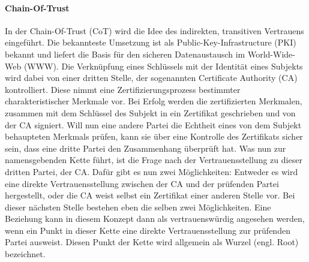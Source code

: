 \paragraph{Chain-Of-Trust}
In der Chain-Of-Trust (CoT) wird die Idee des indirekten, transitiven Vertrauens eingeführt. Die bekannteste Umsetzung ist als Public-Key-Infrastructure (PKI) bekannt und liefert die Basis für den sicheren Datenaustausch im World-Wide-Web (WWW). Die Verknüpfung eines Schlüssels mit der Identität eines Subjekts wird dabei von einer dritten Stelle, der sogenannten Certificate Authority (CA) kontrolliert. Diese nimmt eine Zertifizierungsprozess bestimmter charakteristischer Merkmale vor. Bei Erfolg werden die zertifizierten Merkmalen, zusammen mit dem Schlüssel des Subjekt in ein Zertifikat geschrieben und von der CA signiert. Will nun eine andere Partei die Echtheit eines von dem Subjekt behaupteten Merkmals prüfen, kann sie über eine Kontrolle des Zertifikats sicher sein, dass eine dritte Partei den Zusammenhang überprüft hat. Was nun zur namensgebenden Kette führt, ist die Frage nach der Vertrauensstellung zu dieser dritten Partei, der CA. Dafür gibt es nun zwei Möglichkeiten: Entweder es wird eine direkte Vertrauensstellung zwischen der CA und der prüfenden Partei hergestellt, oder die CA weist selbst ein Zertifikat einer anderen Stelle vor. Bei dieser nächsten Stelle bestehen eben die selben zwei Möglichkeiten. Eine Beziehung kann in diesem Konzept dann als vertrauenswürdig angesehen werden, wenn ein Punkt in dieser Kette eine direkte Vertrauensstellung zur prüfenden Partei ausweist. Diesen Punkt der Kette wird allgemein als Wurzel (engl. Root) bezeichnet\cite[p. 423 ff.]{Eckert2013}.  
